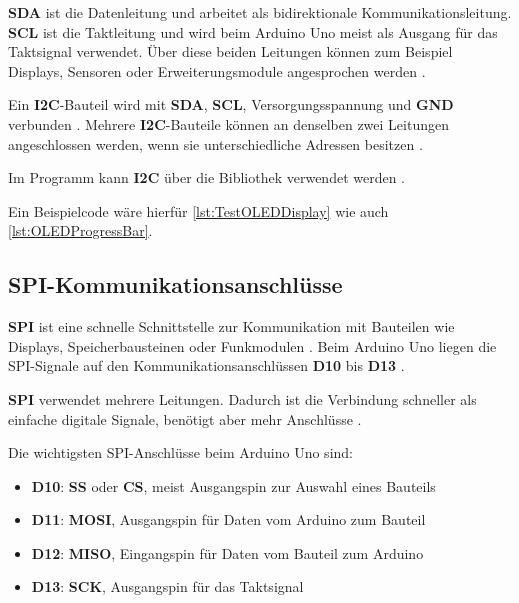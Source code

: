 \textbf{SDA} ist die Datenleitung und arbeitet als bidirektionale Kommunikationsleitung. \textbf{SCL} ist die Taktleitung und wird beim Arduino Uno meist als Ausgang für das Taktsignal verwendet. Über diese beiden Leitungen können zum Beispiel Displays, Sensoren oder Erweiterungsmodule angesprochen werden \cite{arduino:language-reference}.



Ein \textbf{I2C}-Bauteil wird mit \textbf{SDA}, \textbf{SCL}, Versorgungsspannung und \textbf{GND} verbunden \cite{arduino:uno-datasheet}. Mehrere \textbf{I2C}-Bauteile können an denselben zwei Leitungen angeschlossen werden, wenn sie unterschiedliche Adressen besitzen \cite{arduino:language-reference}.

Im Programm kann \textbf{I2C} über die Bibliothek  verwendet werden \cite{arduino:language-reference}.

Ein Beispielcode wäre hierfür \ref{lst:TestOLEDDisplay} wie auch \ref{lst:OLEDProgressBar}.



\subsection{SPI-Kommunikationsanschlüsse}


\textbf{SPI} ist eine schnelle Schnittstelle zur Kommunikation mit Bauteilen wie Displays, Speicherbausteinen oder Funkmodulen \cite{arduino:language-reference}. Beim Arduino Uno liegen die SPI-Signale auf den Kommunikationsanschlüssen \textbf{D10} bis \textbf{D13} \cite{arduino:uno-datasheet}.

\textbf{SPI} verwendet mehrere Leitungen. Dadurch ist die Verbindung schneller als einfache digitale Signale, benötigt aber mehr Anschlüsse \cite{arduino:language-reference}.



Die wichtigsten SPI-Anschlüsse beim Arduino Uno sind:
\begin{itemize}
	\item \textbf{D10}: \textbf{SS} oder \textbf{CS}, meist Ausgangspin zur Auswahl eines Bauteils
	\item \textbf{D11}: \textbf{MOSI}, Ausgangspin für Daten vom Arduino zum Bauteil
	\item \textbf{D12}: \textbf{MISO}, Eingangspin für Daten vom Bauteil zum Arduino
	\item \textbf{D13}: \textbf{SCK}, Ausgangspin für das Taktsignal \cite{arduino:uno-datasheet}
\end{itemize}

